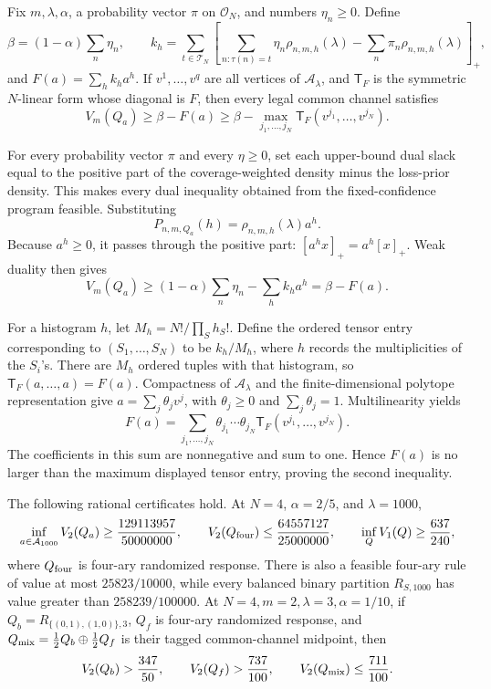 Fix \(m,\lambda,\alpha\), a probability vector \(\pi\) on \(\mathcal O_N\), and numbers \(\eta_n\ge0\).  Define
\[
 \beta=(1-\alpha)\sum_n\eta_n,
 \qquad
 k_h=\sum_{t\in\mathcal T_N}\left[
 \sum_{n:\tau(n)=t}\eta_n\rho_{n,m,h}(\lambda)
 -\sum_n\pi_n\rho_{n,m,h}(\lambda)
 \right]_+,
\]
and \(F(a)=\sum_hk_ha^h\).  If \(v^1,\ldots,v^q\) are all vertices of \(\mathcal A_\lambda\), and \(\mathsf T_F\) is the symmetric \(N\)-linear form whose diagonal is \(F\), then every legal common channel satisfies
\[
 V_m(Q_a)\ge\beta-F(a)
 \ge\beta-\max_{j_1,\ldots,j_N}\mathsf T_F(v^{j_1},\ldots,v^{j_N}).
\]

For every probability vector \(\pi\) and every \(\eta\ge0\), set each upper-bound dual slack equal to the positive part of the coverage-weighted density minus the loss-prior density.  This makes every dual inequality obtained from the fixed-confidence program feasible.  Substituting
\[
 P_{n,m,Q_a}(h)=\rho_{n,m,h}(\lambda)a^h.
\]
Because \(a^h\ge0\), it passes through the positive part: \([a^hx]_+=a^h[x]_+\).  Weak duality then gives
\[
 V_m(Q_a)\ge (1-\alpha)\sum_n\eta_n-\sum_hk_ha^h
 =\beta-F(a).
\]

For a histogram \(h\), let \(M_h=N!/\prod_Sh_S!\).  Define the ordered tensor entry corresponding to \((S_1,\ldots,S_N)\) to be \(k_h/M_h\), where \(h\) records the multiplicities of the \(S_i\)'s.  There are \(M_h\) ordered tuples with that histogram, so \(\mathsf T_F(a,\ldots,a)=F(a)\).  Compactness of \(\mathcal A_\lambda\) and the finite-dimensional polytope representation give \(a=\sum_j\theta_jv^j\), with \(\theta_j\ge0\) and \(\sum_j\theta_j=1\).  Multilinearity yields
\[
 F(a)=\sum_{j_1,\ldots,j_N}
 \theta_{j_1}\cdots\theta_{j_N}
 \mathsf T_F(v^{j_1},\ldots,v^{j_N}).
\]
The coefficients in this sum are nonnegative and sum to one.  Hence \(F(a)\) is no larger than the maximum displayed tensor entry, proving the second inequality.

The following rational certificates hold.  At \(N=4\), \(\alpha=2/5\), and \(\lambda=1000\),
\[
 \inf_{a\in\mathcal A_{1000}}V_2(Q_a)\ge\frac{129113957}{50000000},
 \qquad
 V_2(Q_{\rm four})\le\frac{64557127}{25000000},
 \qquad
 \inf_QV_1(Q)\ge\frac{637}{240},
\]
where \(Q_{\rm four}\) is four-ary randomized response.  There is also a feasible four-ary rule of value at most \(25823/10000\), while every balanced binary partition \(R_{S,1000}\) has value greater than \(258239/100000\).  At \(N=4,m=2,\lambda=3,\alpha=1/10\), if \(Q_b=R_{\{(0,1),(1,0)\},3}\), \(Q_f\) is four-ary randomized response, and \(Q_{\rm mix}=\tfrac12Q_b\oplus\tfrac12Q_f\) is their tagged common-channel midpoint, then
\[
 V_2(Q_b)>\frac{347}{50},\qquad
 V_2(Q_f)>\frac{737}{100},\qquad
 V_2(Q_{\rm mix})\le\frac{711}{100}.
\]

